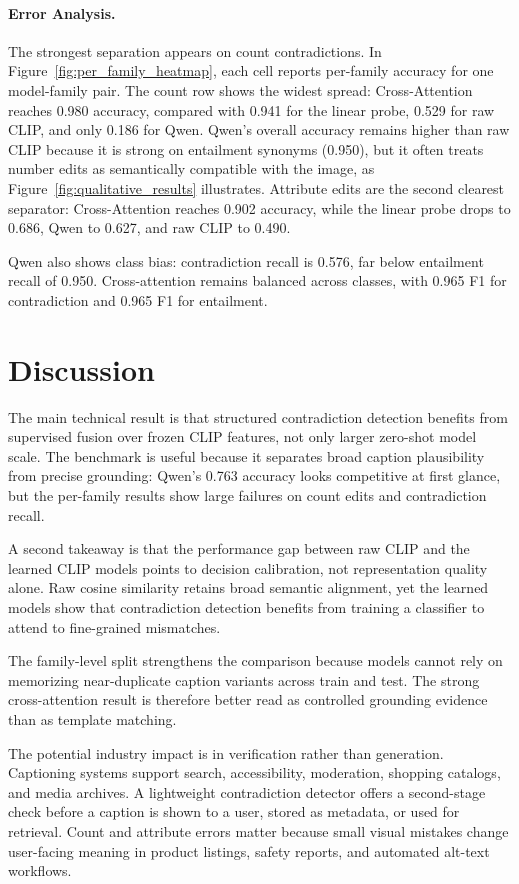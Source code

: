 \documentclass[10pt,twocolumn,letterpaper]{article}
\begin{document}
\paragraph{Error Analysis.}
The strongest separation appears on count contradictions. In Figure~\ref{fig:per_family_heatmap}, each cell reports per-family accuracy for one model-family pair. The count row shows the widest spread: Cross-Attention reaches 0.980 accuracy, compared with 0.941 for the linear probe, 0.529 for raw CLIP, and only 0.186 for Qwen. Qwen's overall accuracy remains higher than raw CLIP because it is strong on entailment synonyms (0.950), but it often treats number edits as semantically compatible with the image, as Figure~\ref{fig:qualitative_results} illustrates. Attribute edits are the second clearest separator: Cross-Attention reaches 0.902 accuracy, while the linear probe drops to 0.686, Qwen to 0.627, and raw CLIP to 0.490.

Qwen also shows class bias: contradiction recall is 0.576, far below entailment recall of 0.950. Cross-attention remains balanced across classes, with 0.965 F1 for contradiction and 0.965 F1 for entailment.

\section{Discussion}
\noindent
The main technical result is that structured contradiction detection benefits from supervised fusion over frozen CLIP features, not only larger zero-shot model scale. The benchmark is useful because it separates broad caption plausibility from precise grounding: Qwen's 0.763 accuracy looks competitive at first glance, but the per-family results show large failures on count edits and contradiction recall.

A second takeaway is that the performance gap between raw CLIP and the learned CLIP models points to decision calibration, not representation quality alone. Raw cosine similarity retains broad semantic alignment, yet the learned models show that contradiction detection benefits from training a classifier to attend to fine-grained mismatches.

The family-level split strengthens the comparison because models cannot rely on memorizing near-duplicate caption variants across train and test. The strong cross-attention result is therefore better read as controlled grounding evidence than as template matching.

The potential industry impact is in verification rather than generation. Captioning systems support search, accessibility, moderation, shopping catalogs, and media archives. A lightweight contradiction detector offers a second-stage check before a caption is shown to a user, stored as metadata, or used for retrieval. Count and attribute errors matter because small visual mistakes change user-facing meaning in product listings, safety reports, and automated alt-text workflows.
\end{document}
